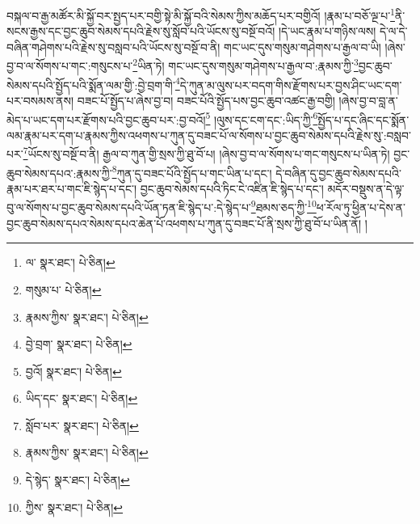 བསྐལ་བ་རྒྱ་མཚོར་མི་སྐྱོ་བར་སྤྱད་པར་བགྱི་སྟེ་མི་སྐྱོ་བའི་སེམས་ཀྱིས་མཆོད་པར་བགྱིའོ། །རྣམ་པ་བཅོ་ལྔ་པ་\footnote{ལ་  སྣར་ཐང་།  པེ་ཅིན། }ནི་སངས་རྒྱས་དང་བྱང་ཆུབ་སེམས་དཔའི་རྗེས་སུ་སློབ་པའི་ཡོངས་སུ་བསྔོ་བའོ། །དེ་ཡང་རྣམ་པ་གཉིས་ལས། དེ་ལ་དེ་བཞིན་གཤེགས་པའི་རྗེས་སུ་བསླབ་པའི་ཡོངས་སུ་བསྔོ་བ་ནི། གང་ཡང་དུས་གསུམ་གཤེགས་པ་རྒྱལ་བ་ཡི། །ཞེས་བྱ་བ་ལ་སོགས་པ་གང་:གསུངས་པ་\footnote{གསུམ་པ་  པེ་ཅིན། }ཡིན་ཏེ། གང་ཡང་དུས་གསུམ་གཤེགས་པ་རྒྱལ་བ་:རྣམས་ཀྱི་\footnote{རྣམས་ཀྱིས་  སྣར་ཐང་།  པེ་ཅིན། }བྱང་ཆུབ་སེམས་དཔའི་སྤྱོད་པའི་སྨོན་ལམ་གྱི་:བྱེ་བྲག་གི་\footnote{བྱེ་བྲག་  སྣར་ཐང་།  པེ་ཅིན། }དེ་ཀུན་མ་ལུས་པར་བདག་གིས་རྫོགས་པར་བྱས་ཤིང་ཡང་དག་པར་བསམས་ནས། བཟང་པོ་སྤྱོད་པ་ཞེས་བྱ་བ། བཟང་པོའི་སྤྱོད་པས་བྱང་ཆུབ་འཚང་རྒྱ་བགྱི། །ཞེས་བྱ་བ་བླ་ན་མེད་པ་ཡང་དག་པར་རྫོགས་པའི་བྱང་ཆུབ་པར་:བྱ་བའོ།\footnote{བྱའོ།  སྣར་ཐང་།  པེ་ཅིན། } །ལུས་དང་ངག་དང་:ཡིད་ཀྱི་\footnote{ཡིད་དང་  སྣར་ཐང་།  པེ་ཅིན། }སྤྱོད་པ་དང་ཞིང་དང་སྨོན་ལམ་རྣམ་པར་དག་པ་རྣམས་ཀྱིས་འཕགས་པ་ཀུན་དུ་བཟང་པོ་ལ་སོགས་པ་བྱང་ཆུབ་སེམས་དཔའི་རྗེས་སུ་:བསླབ་པར་\footnote{སློབ་པར་  སྣར་ཐང་།  པེ་ཅིན། }ཡོངས་སུ་བསྔོ་བ་ནི། རྒྱལ་བ་ཀུན་གྱི་སྲས་ཀྱི་ཐུ་བོ་པ། །ཞེས་བྱ་བ་ལ་སོགས་པ་གང་གསུངས་པ་ཡིན་ཏེ། བྱང་ཆུབ་སེམས་དཔའ་:རྣམས་ཀྱི་\footnote{རྣམས་ཀྱིས་  སྣར་ཐང་།  པེ་ཅིན། }ཀུན་དུ་བཟང་པོའི་སྤྱོད་པ་གང་ཡིན་པ་དང་། དེ་བཞིན་དུ་བྱང་ཆུབ་སེམས་དཔའི་རྣམ་པར་ཐར་པ་གང་ཇི་སྙེད་པ་དང་། བྱང་ཆུབ་སེམས་དཔའི་ཏིང་ངེ་འཛིན་ཇི་སྙེད་པ་དང་། མདོར་བསྡུས་ན་དེ་ལྟ་བུ་ལ་སོགས་པ་བྱང་ཆུབ་སེམས་དཔའི་ཡོན་ཏན་ཇི་སྙེད་པ་:དེ་སྙེད་པ་\footnote{དེ་སྙེད་  སྣར་ཐང་།  པེ་ཅིན། }ཐམས་ཅད་ཀྱི་\footnote{ཀྱིས་  སྣར་ཐང་།  པེ་ཅིན། }ཕ་རོལ་ཏུ་ཕྱིན་པ་དེས་ན་བྱང་ཆུབ་སེམས་དཔའ་སེམས་དཔའ་ཆེན་པོ་འཕགས་པ་ཀུན་དུ་བཟང་པོ་ནི་སྲས་ཀྱི་ཐུ་བོ་པ་ཡིན་ནོ། །
